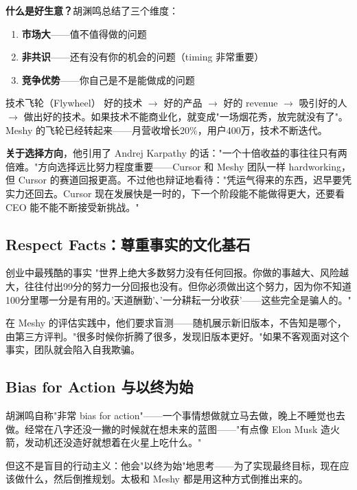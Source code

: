 \documentclass[a4paper]{article}
\begin{document}
\textbf{什么是好生意？}胡渊鸣总结了三个维度：
\begin{enumerate}
\item \textbf{市场大}——值不值得做的问题
\item \textbf{非共识}——还有没有你的机会的问题（timing 非常重要）
\item \textbf{竞争优势}——你自己是不是能做成的问题
\end{enumerate}

\begin{importantbox}{技术飞轮（Flywheel）}
好的技术 $\rightarrow$ 好的产品 $\rightarrow$ 好的 revenue $\rightarrow$ 吸引好的人 $\rightarrow$ 做出好的技术。如果技术不能商业化，就变成"一场烟花秀，放完就没有了"。Meshy 的飞轮已经转起来——月营收增长20\%，用户400万，技术不断迭代。
\end{importantbox}

\textbf{关于选择方向}，他引用了 Andrej Karpathy 的话："一个十倍收益的事往往只有两倍难。"方向选择远比努力程度重要——Cursor 和 Meshy 团队一样 hardworking，但 Cursor 的赛道回报更高。不过他也辩证地看待："凭运气得来的东西，迟早要凭实力还回去。Cursor 现在发展快是一时的，下一个阶段能不能做得更大，还要看 CEO 能不能不断接受新挑战。"

\subsection{Respect Facts：尊重事实的文化基石}

\begin{warningbox}{创业中最残酷的事实}
"世界上绝大多数努力没有任何回报。你做的事越大、风险越大，往往付出99分的努力一分回报也没有。但你必须做出这个努力，因为你不知道100分里哪一分是有用的。'天道酬勤'、'一分耕耘一分收获'——这些完全是骗人的。"
\end{warningbox}

在 Meshy 的评估实践中，他们要求盲测——随机展示新旧版本，不告知是哪个，由第三方评判。"很多时候你折腾了很多，发现旧版本更好。"如果不客观面对这个事实，团队就会陷入自我欺骗。

\subsection{Bias for Action 与以终为始}

胡渊鸣自称"非常 bias for action"——一个事情想做就立马去做，晚上不睡觉也去做。经常在八字还没一撇的时候就在想未来的蓝图——"有点像 Elon Musk 造火箭，发动机还没造好就想着在火星上吃什么。"

但这不是盲目的行动主义：他会"以终为始"地思考——为了实现最终目标，现在应该做什么，然后倒推规划。太极和 Meshy 都是用这种方式倒推出来的。
\end{document}
